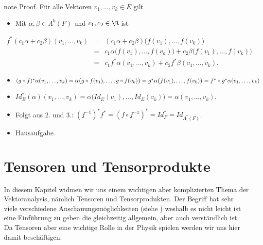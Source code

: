 \documentclass[letterpaper,10pt,english]{jupyterBook}
\begin{document}
\begin{sphinxadmonition}{note}
\sphinxAtStartPar
Proof. Für alle Vektoren \(v_1,\ldots,v_k\in E\) gilt
\begin{itemize}
\item {} 
\sphinxAtStartPar
Mit \(\alpha, \beta\in\Lambda^k(F)\) und \(c_1,c_2\in\R\) ist

\end{itemize}
\begin{equation*}
\begin{split}f^*(c_1\alpha+c_2\beta)(v_1,\ldots,v_k)
 &=& (c_1\alpha+c_2\beta) \big(f(v_1),\ldots,f(v_k)\big)\\
&=& c_1\alpha\big(f(v_1),\ldots,f(v_k)\big) + c_2\beta\big(f(v_1),\ldots,f(v_k)\big)\\
&=& c_1f^*\alpha(v_1,\ldots,v_k)+c_2f^*\beta(v_1,\ldots,v_k).\end{split}
\end{equation*}\begin{itemize}
\item {} 
\sphinxAtStartPar
\((g\circ f)^*\alpha( v_1,\ldots, v_k) = \alpha\big(g\circ f( v_1),\ldots, g\circ f( v_k)\big)= g^*\alpha\big(f( v_1),\ldots,f( v_k)\big)\\=  f^*\circ g^*\alpha( v_1,\ldots, v_k)\)

\item {} 
\sphinxAtStartPar
\(Id_E^*(\alpha)(v_1,\ldots,v_k) = \alpha\big(Id_E(v_1),\ldots,Id_E(v_k)\big)
= \alpha(v_1,\ldots,v_k)\).

\item {} 
\sphinxAtStartPar
Folgt aus 2. und 3.: \((f^{-1})^*f^* = (f\circ f^{-1})^* = Id_F^* =
Id_{\Lambda^*(F)}\).

\item {} 
\sphinxAtStartPar
Hausaufgabe.

\end{itemize}
\end{sphinxadmonition}


\section{Tensoren und Tensorprodukte}
\label{\detokenize{vektoranalysis/tensor:tensoren-und-tensorprodukte}}\label{\detokenize{vektoranalysis/tensor::doc}}
\sphinxAtStartPar
In diesem Kapitel widmen wir uns einem wichtigen aber komplizierten Thema der Vektoranalysis, nämlich Tensoren und Tensorprodukten.
Der Begriff hat sehr viele verschiedene Anschauungsmöglichkeiten (siehe ) weshalb es nicht leicht ist eine Einführung zu geben die gleichzeitig allgemein, aber auch verständlich ist. Da Tensoren aber eine wichtige Rolle in der Physik spielen werden wir uns hier damit beschäftigen.
\end{document}

